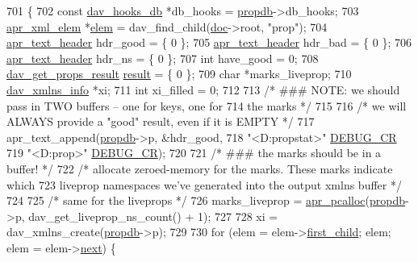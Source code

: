 \begin{DoxyCode}
701 \{
702     \textcolor{keyword}{const} \hyperlink{structdav__hooks__propdb}{dav\_hooks\_db} *db\_hooks = \hyperlink{group__MOD__DAV_gac428117c2c7c0121d6e49a52085fd196}{propdb}->db\_hooks;
703     \hyperlink{structapr__xml__elem}{apr\_xml\_elem} *\hyperlink{structelem}{elem} = dav\_find\_child(\hyperlink{group__MOD__DAV_gab79aad8aa27988a0e86b9397d43541e8}{doc}->root, \textcolor{stringliteral}{"prop"});
704     \hyperlink{structapr__text__header}{apr\_text\_header} hdr\_good = \{ 0 \};
705     \hyperlink{structapr__text__header}{apr\_text\_header} hdr\_bad = \{ 0 \};
706     \hyperlink{structapr__text__header}{apr\_text\_header} hdr\_ns = \{ 0 \};
707     \textcolor{keywordtype}{int} have\_good = 0;
708     \hyperlink{structdav__get__props__result}{dav\_get\_props\_result} \hyperlink{group__APACHE__CORE__MPM_ga9f5959dd76d5c83e775dcf44de684686}{result} = \{ 0 \};
709     \textcolor{keywordtype}{char} *marks\_liveprop;
710     \hyperlink{structdav__xmlns__info}{dav\_xmlns\_info} *xi;
711     \textcolor{keywordtype}{int} xi\_filled = 0;
712 
713     \textcolor{comment}{/* ### NOTE: we should pass in TWO buffers -- one for keys, one for}
714 \textcolor{comment}{       the marks */}
715 
716     \textcolor{comment}{/* we will ALWAYS provide a "good" result, even if it is EMPTY */}
717     apr\_text\_append(\hyperlink{group__MOD__DAV_gac428117c2c7c0121d6e49a52085fd196}{propdb}->p, &hdr\_good,
718                    \textcolor{stringliteral}{"<D:propstat>"} \hyperlink{group__MOD__DAV_ga5a242a2983fe78462523e34b6d6e3628}{DEBUG\_CR}
719                    \textcolor{stringliteral}{"<D:prop>"} \hyperlink{group__MOD__DAV_ga5a242a2983fe78462523e34b6d6e3628}{DEBUG\_CR});
720 
721     \textcolor{comment}{/* ### the marks should be in a buffer! */}
722     \textcolor{comment}{/* allocate zeroed-memory for the marks. These marks indicate which}
723 \textcolor{comment}{       liveprop namespaces we've generated into the output xmlns buffer */}
724 
725     \textcolor{comment}{/* same for the liveprops */}
726     marks\_liveprop = \hyperlink{group__apr__pools_gad214fc0160de3c22b6435e29ea20fce8}{apr\_pcalloc}(\hyperlink{group__MOD__DAV_gac428117c2c7c0121d6e49a52085fd196}{propdb}->p, dav\_get\_liveprop\_ns\_count() + 1);
727 
728     xi = dav\_xmlns\_create(\hyperlink{group__MOD__DAV_gac428117c2c7c0121d6e49a52085fd196}{propdb}->p);
729 
730     \textcolor{keywordflow}{for} (elem = elem->\hyperlink{structapr__xml__elem_a620a28337f36592d4cb1f6dd3d2e97e0}{first\_child}; elem; elem = elem->\hyperlink{structapr__xml__elem_a8687253d504b1c1363c47117611042ac}{next}) \{

\end{DoxyCode}
